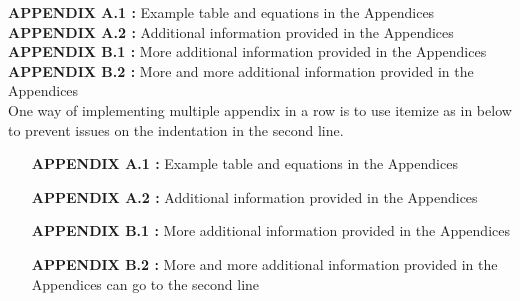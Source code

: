 \eklerkapak{}
\singlespacing
\textbf{APPENDIX A.1 :} Example table and equations in the Appendices\\
\textbf{APPENDIX A.2 :} Additional information provided in the Appendices\\
\textbf{APPENDIX B.1 :} More additional information provided in the Appendices\\
\textbf{APPENDIX B.2 :} More and more additional information provided in the Appendices\\

One way of implementing multiple appendix in a row is to use itemize as in below to prevent issues on the indentation in the second line.

\begin{itemize}[leftmargin=3.3cm,itemsep=-0.4em,labelsep=1.5mm] %
\item [\textbf{APPENDIX A.1 :}]Example table and equations in the Appendices
\item [\textbf{APPENDIX A.2 :}]Additional information provided in the Appendices
\item [\textbf{APPENDIX B.1 :}]More additional information provided in the Appendices
\item [\textbf{APPENDIX B.2 :}]More and more additional information provided in the Appendices can go to the second line
\end{itemize}






\newpage



\vspace*{18pt}



\newpage
